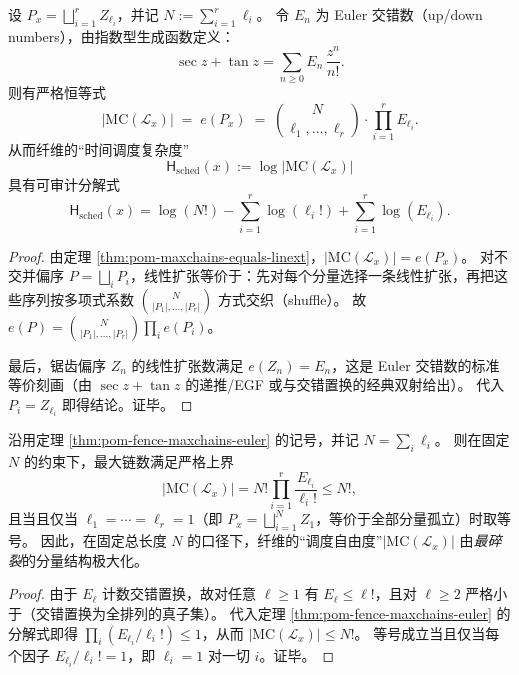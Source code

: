 \begin{theorem}\label{thm:pom-fence-maxchains-euler}
设 \(P_x=\bigsqcup_{i=1}^r Z_{\ell_i}\)，并记 \(N:=\sum_{i=1}^r \ell_i\)。
令 \(E_n\) 为 Euler 交错数（up/down numbers），由指数型生成函数定义：
\[
\sec z+\tan z=\sum_{n\ge 0} E_n\,\frac{z^n}{n!}.
\]
则有严格恒等式
\[
|\mathrm{MC}(\mathcal L_x)|
\;=\;
e(P_x)
\;=\;
\binom{N}{\ell_1,\dots,\ell_r}\cdot \prod_{i=1}^r E_{\ell_i}.
\]
从而纤维的“时间调度复杂度”
\[
\mathsf H_{\mathrm{sched}}(x):=\log |\mathrm{MC}(\mathcal L_x)|
\]
具有可审计分解式
\[
\mathsf H_{\mathrm{sched}}(x)
=\log(N!) -\sum_{i=1}^r \log(\ell_i!) + \sum_{i=1}^r \log(E_{\ell_i}).
\]
\end{theorem}
\begin{proof}
由定理 \ref{thm:pom-maxchains-equals-linext}，\(|\mathrm{MC}(\mathcal L_x)|=e(P_x)\)。
对不交并偏序 \(P=\bigsqcup_i P_i\)，线性扩张等价于：先对每个分量选择一条线性扩张，再把这些序列按多项式系数 \(\binom{N}{|P_1|,\dots,|P_r|}\) 方式交织（shuffle）。
故 \(e(P)=\binom{N}{|P_1|,\dots,|P_r|}\prod_i e(P_i)\)。
\par
最后，锯齿偏序 \(Z_n\) 的线性扩张数满足 \(e(Z_n)=E_n\)，这是 Euler 交错数的标准等价刻画（由 \(\sec z+\tan z\) 的递推/EGF 或与交错置换的经典双射给出）。
代入 \(P_i=Z_{\ell_i}\) 即得结论。证毕。
\end{proof}

\begin{corollary}\label{cor:pom-fence-maxchains-all-isolated-optimal}
沿用定理 \ref{thm:pom-fence-maxchains-euler} 的记号，并记 \(N=\sum_i \ell_i\)。
则在固定 \(N\) 的约束下，最大链数满足严格上界
\[
|\mathrm{MC}(\mathcal L_x)|
=
N!\prod_{i=1}^r \frac{E_{\ell_i}}{\ell_i!}
\le
N!,
\]
且当且仅当 \(\ell_1=\cdots=\ell_r=1\)（即 \(P_x=\bigsqcup_{i=1}^{N} Z_1\)，等价于全部分量孤立）时取等号。
因此，在固定总长度 \(N\) 的口径下，纤维的“调度自由度”\(|\mathrm{MC}(\mathcal L_x)|\) 由\emph{最碎裂}的分量结构极大化。
\end{corollary}
\begin{proof}
由于 \(E_\ell\) 计数交错置换，故对任意 \(\ell\ge 1\) 有 \(E_\ell\le \ell!\)，且对 \(\ell\ge 2\) 严格小于（交错置换为全排列的真子集）。
代入定理 \ref{thm:pom-fence-maxchains-euler} 的分解式即得
\(
\prod_i(E_{\ell_i}/\ell_i!)\le 1
\)，从而 \(|\mathrm{MC}(\mathcal L_x)|\le N!\)。
等号成立当且仅当每个因子 \(E_{\ell_i}/\ell_i!=1\)，即 \(\ell_i=1\) 对一切 \(i\)。证毕。
\end{proof}

